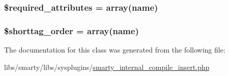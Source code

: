 \subsubsection[{\$required\+\_\+attributes}]{\setlength{\rightskip}{0pt plus 5cm}\$required\+\_\+attributes = array(\textquotesingle{}name\textquotesingle{})}\label{class_smarty___internal___compile___insert_ae799507d5461de485f3a618abeecea95}
\hypertarget{class_smarty___internal___compile___insert_a2ccb25269c3a92e8c4796c7ef23725e6}{}
\subsubsection[{\$shorttag\+\_\+order}]{\setlength{\rightskip}{0pt plus 5cm}\$shorttag\+\_\+order = array(\textquotesingle{}name\textquotesingle{})}\label{class_smarty___internal___compile___insert_a2ccb25269c3a92e8c4796c7ef23725e6}


The documentation for this class was generated from the following file\+:\begin{DoxyCompactItemize}
\item 
libs/smarty/libs/sysplugins/\hyperlink{smarty__internal__compile__insert_8php}{smarty\+\_\+internal\+\_\+compile\+\_\+insert.\+php}\end{DoxyCompactItemize}
